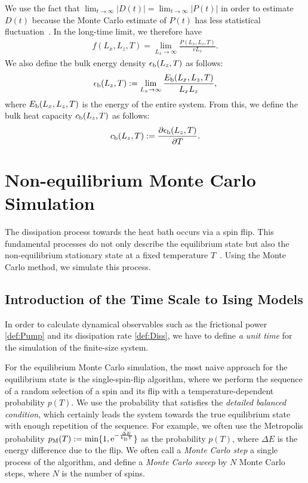 We use the fact that $\lim_{t\to\infty}|D(t)|=\lim_{t\to\infty}|P(t)|$ in order to estimate $D(t)$ because the Monte Carlo estimate of $P(t)$ has less statistical fluctuation~\cite{Magiera2009a, Magiera2011, Magiera2011b}. In the long-time limit, we therefore have
\begin{align}
f(L_{x}, L_{z}, T)=\lim_{L_{x}\to\infty}\frac{P(L_{x}, L_{z}, T)}{vL_{x}}\label{for:frictionalforce2}.
\end{align}
We also define the bulk energy density $\epsilon_{\rm b}(L_{z}, T)$ as follows:
\begin{align}
\epsilon_{\rm b}(L_{z}, T):=\lim_{L_{x}\to\infty}\frac{E_{\rm b}(L_{x}, L_{z}, T)}{L_{x}L_{z}},
\end{align}
where $E_{\rm b}(L_{x}, L_{z}, T)$ is the energy of the entire system. From this, we define the bulk heat capacity $c_{\rm b}(L_{z}, T)$ as follows:
\begin{align}
c_{\rm b}(L_{z}, T):=\frac{\partial \epsilon_{\rm b}(L_{z}, T)}{\partial T}.
\end{align}

\section{Non-equilibrium Monte Carlo Simulation}
The dissipation process towards the heat bath occurs via a spin flip. This fundamental processes do not only describe the equilibrium state but also the non-equilibrium stationary state at a fixed temperature $T$~\cite{Glauber1963}. Using the Monte Carlo method, we simulate this process.

\subsection{Introduction of the Time Scale to Ising Models}
In order to calculate dynamical observables such as the frictional power \eqref{def:Pump} and its dissipation rate \eqref{def:Diss}, we have to define \textit{a unit time} for the simulation of the finite-size system. 

For the equilibrium Monte Carlo simulation, the most naive approach for the equilibrium state is the single-spin-flip algorithm, where we perform the sequence of a random selection of a spin and its flip with a temperature-dependent probability $p(T)$. We use the probability that satisfies the \textit{detailed balanced condition}, which certainly leads the system towards the true equilibrium state with enough repetition of the sequence. For example, we often use the Metropolis probability $p_{\rm M}(T):=\min\{1,\mathrm{e}^{-\frac{\Delta E}{k_{\rm B}T}}\}$ as the probability $p(T)$, where $\Delta E$ is the energy difference due to the flip. We often call a \textit{Monte Carlo step} a single process of the algorithm, and define a \textit{Monte Carlo sweep} by $N$ Monte Carlo steps, where $N$ is the number of spins.

